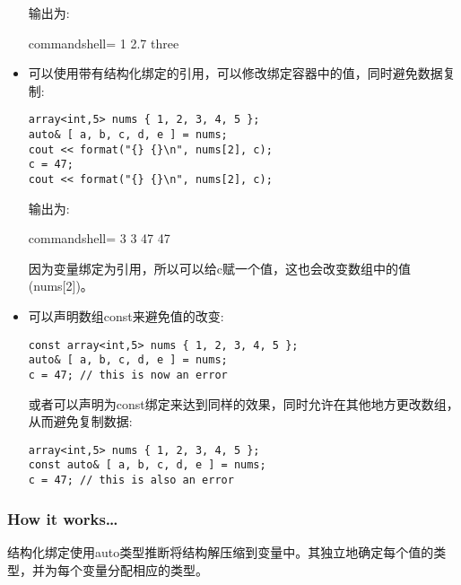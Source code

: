 \begin{itemize}
输出为:

\begin{tcblisting}{commandshell={}}
1 2.7 three
\end{tcblisting}

\item 
可以使用带有结构化绑定的引用，可以修改绑定容器中的值，同时避免数据复制:

\begin{lstlisting}[style=styleCXX]
array<int,5> nums { 1, 2, 3, 4, 5 };
auto& [ a, b, c, d, e ] = nums;
cout << format("{} {}\n", nums[2], c);
c = 47;
cout << format("{} {}\n", nums[2], c);
\end{lstlisting}

输出为:

\begin{tcblisting}{commandshell={}}
3 3
47 47
\end{tcblisting}

因为变量绑定为引用，所以可以给c赋一个值，这也会改变数组中的值(nums[2])。

\item 
可以声明数组const来避免值的改变:

\begin{lstlisting}[style=styleCXX]
const array<int,5> nums { 1, 2, 3, 4, 5 };
auto& [ a, b, c, d, e ] = nums;
c = 47; // this is now an error
\end{lstlisting}

或者可以声明为const绑定来达到同样的效果，同时允许在其他地方更改数组，从而避免复制数据:

\begin{lstlisting}[style=styleCXX]
array<int,5> nums { 1, 2, 3, 4, 5 };
const auto& [ a, b, c, d, e ] = nums;
c = 47; // this is also an error
\end{lstlisting}

\end{itemize}

\subsubsection{How it works…}

结构化绑定使用auto类型推断将结构解压缩到变量中。其独立地确定每个值的类型，并为每个变量分配相应的类型。

